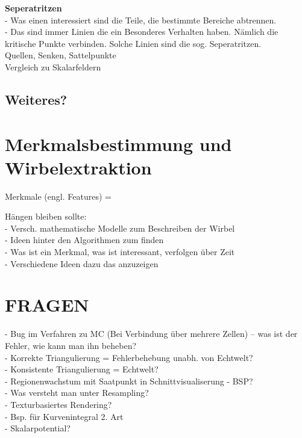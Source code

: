 \documentclass{article}
\begin{document}
\noindent \textbf{Seperatritzen}\\
- Was einen interessiert sind die Teile, die bestimmte Bereiche abtrennen.\\
- Das sind immer Linien die ein Besonderes Verhalten haben. Nämlich die kritische Punkte verbinden. Solche Linien sind die sog. Seperatritzen.\\

\noindent Quellen, Senken, Sattelpunkte\\

\noindent Vergleich zu Skalarfeldern

\subsection{Weiteres?}

\pagebreak
\section{Merkmalsbestimmung und Wirbelextraktion}
Merkmale (engl. Features) = 


Hängen bleiben sollte:\\
- Versch. mathematische Modelle zum Beschreiben der Wirbel\\
- Ideen hinter den Algorithmen zum finden \\
- Was ist ein Merkmal, was ist interessant, verfolgen über Zeit\\
- Verschiedene Ideen dazu das anzuzeigen

\pagebreak
\section{FRAGEN}
- Bug im Verfahren zu MC (Bei Verbindung über mehrere Zellen) -- was ist der Fehler, wie kann man ihn beheben?\\
- Korrekte Triangulierung = Fehlerbehebung unabh. von Echtwelt?\\ 
- Konsistente Triangulierung = Echtwelt?\\
- Regionenwachstum mit Saatpunkt in Schnittvisualiserung - BSP?\\
- Was versteht man unter Resampling?\\
- Texturbasiertes Rendering?\\
- Bsp. für Kurvenintegral 2. Art\\
- Skalarpotential?
\end{document}

